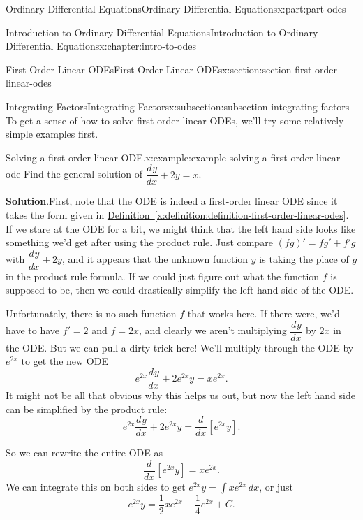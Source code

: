 \documentclass[twoside,10pt,]{book}
\newcommand{\blocktitlefont}{\relax}
\newcommand{\xreffont}{\relax}
\numberwithin{equation}{part}
\providecommand{\dv}[3][]{\dfrac{d^{#1} #2}{d #3^{#1}}}
\begin{document}
\begin{partptx}{Ordinary Differential Equations}{}{Ordinary Differential Equations}{}{}{x:part:part-odes}
\begin{chapterptx}{Introduction to Ordinary Differential Equations}{}{Introduction to Ordinary Differential Equations}{}{}{x:chapter:intro-to-odes}
\begin{sectionptx}{First-Order Linear ODEs}{}{First-Order Linear ODEs}{}{}{x:section:section-first-order-linear-odes}
%
%
\typeout{************************************************}
\typeout{************************************************}
%
\begin{subsectionptx}{Integrating Factors}{}{Integrating Factors}{}{}{x:subsection:subsection-integrating-factors}
To get a sense of how to solve first-order linear ODEs, we'll try some relatively simple examples first.%
\begin{example}{Solving a first-order linear ODE.}{x:example:example-solving-a-first-order-linear-ode}%
Find the general solution of \(\dv{y}{x}+2y = x\).%
\par\smallskip%
\noindent\textbf{\blocktitlefont Solution}.\hypertarget{g:solution:idp105548816256160}{}\quad{}First, note that the ODE is indeed a first-order linear ODE since it takes the form given in \hyperref[x:definition:definition-first-order-linear-odes]{Definition~{\xreffont\ref{x:definition:definition-first-order-linear-odes}}}. If we stare at the ODE for a bit, we might think that the left hand side looks like something we'd get after using the product rule. Just compare \((fg)' = fg'+f'g\) with \(\dv{y}{x}+2y\), and it appears that the unknown function \(y\) is taking the place of \(g\) in the product rule formula. If we could just figure out what the function \(f\) is supposed to be, then we could drastically simplify the left hand side of the ODE.%
\par
Unfortunately, there is no such function \(f\) that works here. If there were, we'd have to have \(f'=2\) and \(f=2x\), and clearly we aren't multiplying \(\dv{y}{x}\) by \(2x\) in the ODE. But we can pull a dirty trick here! We'll multiply through the ODE by \(e^{2x}\) to get the new ODE%
\begin{equation*}
e^{2x}\dv{y}{x}+2e^{2x}y = xe^{2x}.
\end{equation*}
It might not be all that obvious why this helps us out, but now the left hand side can be simplified by the product rule:%
\begin{equation*}
e^{2x}\dv{y}{x}+2e^{2x}y = \dv{}{x}[e^{2x}y].
\end{equation*}
%
\par
So we can rewrite the entire ODE as%
\begin{equation*}
\dv{}{x}[e^{2x}y] = xe^{2x}.
\end{equation*}
We can integrate this on both sides to get \(e^{2x}y = \int xe^{2x}\,dx\), or just%
\begin{equation*}
e^{2x}y = \frac{1}{2}xe^{2x} - \frac{1}{4}e^{2x}+C.

\end{equation*}
\end{example}
\end{subsectionptx}
\end{sectionptx}
\end{chapterptx}
\end{partptx}
\end{document}
